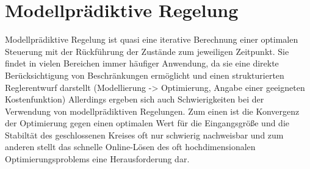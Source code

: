 \section{Modellprädiktive Regelung}
Modellprädiktive Regelung ist quasi eine iterative Berechnung einer optimalen Steuerung mit der Rückführung der Zustände zum jeweiligen Zeitpunkt. Sie findet in vielen Bereichen immer häufiger Anwendung, da sie eine direkte Berücksichtigung von Beschränkungen ermöglicht und einen strukturierten Reglerentwurf darstellt (Modellierung -> Optimierung, Angabe einer geeigneten Kostenfunktion) Allerdings ergeben sich auch Schwierigkeiten bei der Verwendung von modellprädiktiven Regelungen. Zum einen ist die Konvergenz der Optimierung gegen einen optimalen Wert für die Eingangsgröße und die Stabiltät des geschlossenen Kreises oft nur schwierig nachweisbar und zum anderen stellt das schnelle Online-Lösen des oft hochdimensionalen Optimierungsproblems eine Herausforderung dar.
\\
